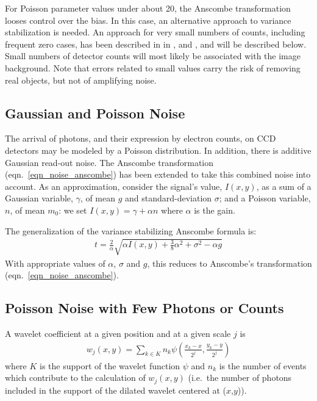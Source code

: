 For Poisson parameter values under about 20, the Anscombe transformation 
looses control over the bias.  In this case, an alternative approach to 
variance stabilization is needed. An approach for very small numbers of 
counts, including frequent zero cases, has been described in 
in \cite{astro:slezak93}, \cite{astro:bijaoui94} and \cite{astro:bury95},
and  will be described below. 
Small numbers of detector counts will most likely be associated  with the 
image background. 
Note that errors related to small values carry the risk of 
removing real objects, but not of amplifying noise.   

\subsection*{Gaussian and Poisson Noise}

The arrival of photons, and their expression by electron counts, on CCD
detectors may be modeled by a Poisson distribution.  In addition, there is 
additive Gaussian read-out noise.  
The Anscombe 
transformation (eqn.\ \ref{eqn_noise_anscombe}) has been extended \cite{starck:mur95_2}
to take this combined noise into account.
As an
approximation, consider the signal's value, $I(x,y)$, as a sum of a Gaussian
variable, $\gamma$, of mean $g$ and standard-deviation $\sigma$; and a
Poisson variable, $n$, of mean $m_0$: we set 
$I(x,y) = \gamma + \alpha n $ where $\alpha$
is the gain.  

The generalization of the variance stabilizing Anscombe formula is:
\begin{eqnarray}
t = \frac{2}{\alpha} \sqrt{\alpha I(x,y) + \frac{3}{8} \alpha^2 + \sigma^2 -
\alpha g}
\label{eqn_noise_bijaoui}
\end{eqnarray}
With appropriate values of $\alpha$, $\sigma$ and $g$, this reduces to 
Anscombe's transformation (eqn.\ \ref{eqn_noise_anscombe}).  


\subsection*{Poisson Noise with Few Photons or Counts}
\label{noise_few_photons}

A wavelet coefficient at a given position and at a given scale $j$ is
\begin{eqnarray}
w_j(x,y) =  \sum_{k \in K} n_k \psi(\frac{x_k - x}{2^j} , \frac{y_k - y}{2^j})
\end{eqnarray}
where $K$ is the support of the wavelet function  $\psi$ and $n_k$ is the 
number  of events which contribute to the calculation of $w_j(x,y)$ (i.e.\ the 
number of 
photons included in the support of the dilated wavelet centered at ($x$,$y$)).

